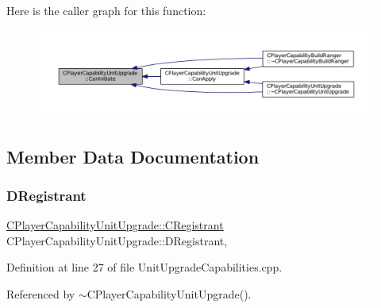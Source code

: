 Here is the caller graph for this function\+:\nopagebreak
\begin{figure}[H]
\begin{center}
\leavevmode
\includegraphics[width=350pt]{classCPlayerCapabilityUnitUpgrade_ad01fc5df598efea4063ac2bbf0ba34e9_icgraph}
\end{center}
\end{figure}


\subsection{Member Data Documentation}
\hypertarget{classCPlayerCapabilityUnitUpgrade_a7c078a1318b7cf56d1810ccd46b8fd8d}{}\label{classCPlayerCapabilityUnitUpgrade_a7c078a1318b7cf56d1810ccd46b8fd8d} 
\subsubsection{\texorpdfstring{D\+Registrant}{DRegistrant}}
{\footnotesize\ttfamily \hyperlink{classCPlayerCapabilityUnitUpgrade_1_1CRegistrant}{C\+Player\+Capability\+Unit\+Upgrade\+::\+C\+Registrant} C\+Player\+Capability\+Unit\+Upgrade\+::\+D\+Registrant\hspace{0.3cm}{\ttfamily [static]}, {\ttfamily [protected]}}



Definition at line 27 of file Unit\+Upgrade\+Capabilities.\+cpp.



Referenced by $\sim$\+C\+Player\+Capability\+Unit\+Upgrade().

\hypertarget{classCPlayerCapabilityUnitUpgrade_a5de8bffd6935c699f431329ad4ee5eec}{}\label{classCPlayerCapabilityUnitUpgrade_a5de8bffd6935c699f431329ad4ee5eec} 
